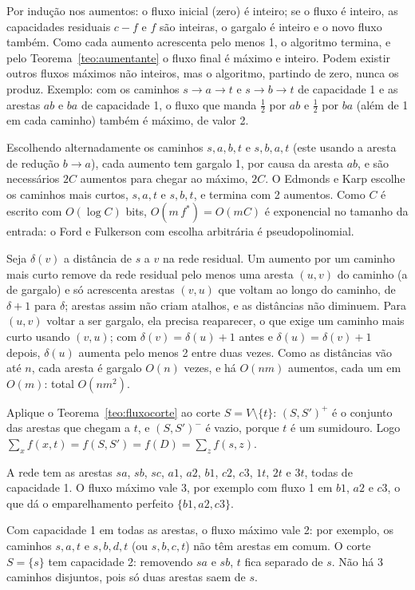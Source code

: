  Por indução nos aumentos: o fluxo inicial (zero) é inteiro; se o fluxo é inteiro, as capacidades residuais $c-f$ e $f$ são inteiras, o gargalo é inteiro e o novo fluxo também. Como cada aumento acrescenta pelo menos 1, o algoritmo termina, e pelo Teorema~\ref{teo:aumentante} o fluxo final é máximo e inteiro. Podem existir outros fluxos máximos não inteiros, mas o algoritmo, partindo de zero, nunca os produz. Exemplo: com os caminhos $s\to a\to t$ e $s\to b\to t$ de capacidade 1 e as arestas $ab$ e $ba$ de capacidade 1, o fluxo que manda $\frac12$ por $ab$ e $\frac12$ por $ba$ (além de 1 em cada caminho) também é máximo, de valor 2.

 Escolhendo alternadamente os caminhos $s,a,b,t$ e $s,b,a,t$ (este usando a aresta de redução $b\to a$), cada aumento tem gargalo 1, por causa da aresta $ab$, e são necessários $2C$ aumentos para chegar ao máximo, $2C$. O Edmonds e Karp escolhe os caminhos mais curtos, $s,a,t$ e $s,b,t$, e termina com 2 aumentos. Como $C$ é escrito com $O(\log C)$ bits, $O(m\,f^*)=O(mC)$ é exponencial no tamanho da entrada: o Ford e Fulkerson com escolha arbitrária é pseudopolinomial.

 Seja $\delta(v)$ a distância de $s$ a $v$ na rede residual. Um aumento por um caminho mais curto remove da rede residual pelo menos uma aresta $(u,v)$ do caminho (a de gargalo) e só acrescenta arestas $(v,u)$ que voltam ao longo do caminho, de $\delta+1$ para $\delta$; arestas assim não criam atalhos, e as distâncias não diminuem. Para $(u,v)$ voltar a ser gargalo, ela precisa reaparecer, o que exige um caminho mais curto usando $(v,u)$; com $\delta(v)=\delta(u)+1$ antes e $\delta(u)=\delta(v)+1$ depois, $\delta(u)$ aumenta pelo menos 2 entre duas vezes. Como as distâncias vão até $n$, cada aresta é gargalo $O(n)$ vezes, e há $O(nm)$ aumentos, cada um em $O(m)$: total $O(nm^2)$.

 Aplique o Teorema~\ref{teo:fluxocorte} ao corte $S=V\setminus\{t\}$: $(S,S')^+$ é o conjunto das arestas que chegam a $t$, e $(S,S')^-$ é vazio, porque $t$ é um sumidouro. Logo $\sum_xf(x,t)=f(S,S')=f(D)=\sum_zf(s,z)$.

 A rede tem as arestas $sa$, $sb$, $sc$, $a1$, $a2$, $b1$, $c2$, $c3$, $1t$, $2t$ e $3t$, todas de capacidade 1. O fluxo máximo vale 3, por exemplo com fluxo 1 em $b1$, $a2$ e $c3$, o que dá o emparelhamento perfeito $\{b1,a2,c3\}$.

 Com capacidade 1 em todas as arestas, o fluxo máximo vale 2: por exemplo, os caminhos $s,a,t$ e $s,b,d,t$ (ou $s,b,c,t$) não têm arestas em comum. O corte $S=\{s\}$ tem capacidade 2: removendo $sa$ e $sb$, $t$ fica separado de $s$. Não há 3 caminhos disjuntos, pois só duas arestas saem de $s$.

